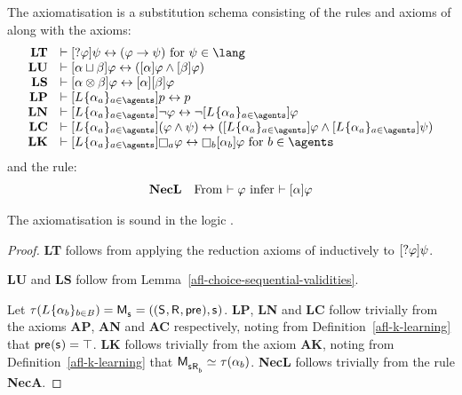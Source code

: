 \begin{definition}\label{afl-k-axioms}
The axiomatisation \axiomAflK{} is a substitution schema consisting of the rules and axioms of \axiomK{} along with the axioms:
$$
\begin{array}{rl}
    {\bf LT} & \proves \actionA{\test{\phi}} \psi \iff (\phi \implies \psi) \text{ for } \psi \in \lang\\
    {\bf LU} & \proves \actionA{\alpha \choice \beta} \phi \iff (\actionA{\alpha} \phi \land \actionA{\beta} \phi)\\
    {\bf LS} & \proves \actionA{\alpha \compose \beta} \phi \iff \actionA{\alpha} \actionA{\beta} \phi\\
    {\bf LP} & \proves \actionA{\learns \{\alpha_\agentA\}_{\agentA \in \agents}} \atomP \iff \atomP\\
    {\bf LN} & \proves \actionA{\learns \{\alpha_\agentA\}_{\agentA \in \agents}} \neg \phi \iff \neg \actionA{\learns \{\alpha_\agentA\}_{\agentA \in \agents}} \phi\\
    {\bf LC} & \proves \actionA{\learns \{\alpha_\agentA\}_{\agentA \in \agents}} (\phi \land \psi) \iff (\actionA{\learns \{\alpha_\agentA\}_{\agentA \in \agents}} \phi \land \actionA{\learns \{\alpha_\agentA\}_{\agentA \in \agents}} \psi)\\
    {\bf LK} & \proves \actionA{\learns \{\alpha_\agentA\}_{\agentA \in \agents}} \necessaryA \phi \iff \necessaryB \actionA{\alpha_\agentB} \phi \text{ for } \agentB \in \agents\\
\end{array}
$$
and the rule:
$$
\begin{array}{rl}
    {\bf NecL} & \text{From $\vdash \varphi$ infer $\vdash {[ {\alpha} ]} \varphi$}
\end{array}
$$
\end{definition}

\begin{lemma}\label{afl-k-axioms-soundness}
The axiomatisation \axiomAflK{} is sound in the logic \logicAmlK{}.
\end{lemma}

\begin{proof}
{\bf LT} follows from applying the reduction axioms of \axiomAmlK{} inductively to ${[ {?{\varphi}} ]} \psi$.

{\bf LU} and {\bf LS} follow from Lemma~\ref{afl-choice-sequential-validities}.

Let $\tau(\learns \{\alpha_\agentB\}_{\agentB \in \agentsB}) = \aPModel{\aStateS} = \aPModelTuple{\aStateS}$.
{\bf LP}, {\bf LN} and {\bf LC} follow trivially from the \axiomAmlK{} axioms {\bf AP}, {\bf AN} and {\bf AC} respectively, noting from Definition~\ref{afl-k-learning} that $\aPrecondition(\aStateS) = \top$.
{\bf LK} follows trivially from the \axiomAmlK{} axiom {\bf AK}, noting from Definition~\ref{afl-k-learning} that $\aPModel{\aStateS \aAccessibility{\agentB}} \bisimilar \tau(\alpha_\agentB)$.
{\bf NecL} follows trivially from the \axiomAmlK{} rule {\bf NecA}.
\end{proof}

